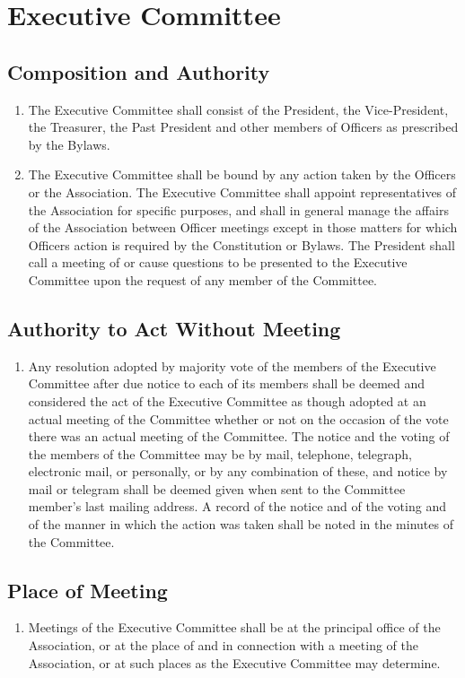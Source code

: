 \section{Executive Committee}

\subsection{Composition and Authority}
\begin{enumerate}
	\item The Executive Committee shall consist of the President, the Vice-President, the Treasurer, the Past President and other members of Officers as prescribed by the Bylaws.
	\item The Executive Committee shall be bound by any action taken by the Officers or the Association. The Executive Committee shall appoint representatives of the Association for specific purposes, and shall in general manage the affairs of the Association between Officer meetings except in those matters for which Officers action is required by the Constitution or Bylaws. The President shall call a meeting of or cause questions to be presented to the Executive Committee upon the request of any member of the Committee.
\end{enumerate}

\subsection{Authority to Act Without Meeting}
\begin{enumerate}
	\item Any resolution adopted by majority vote of the members of the Executive Committee after due notice to each of its members shall be deemed and considered the act of the Executive Committee as though adopted at an actual meeting of the Committee whether or not on the occasion of the vote there was an actual meeting of the Committee. The notice and the voting of the members of the Committee may be by mail, telephone, telegraph, electronic mail, or personally, or by any combination of these, and notice by mail or telegram shall be deemed given when sent to the Committee member's last mailing address. A record of the notice and of the voting and of the manner in which the action was taken shall be noted in the minutes of the Committee.
\end{enumerate}

\subsection{Place of Meeting}
\begin{enumerate}
	\item Meetings of the Executive Committee shall be at the principal office of the Association, or at the place of and in connection with a meeting of the Association, or at such places as the Executive Committee may determine.
\end{enumerate}

